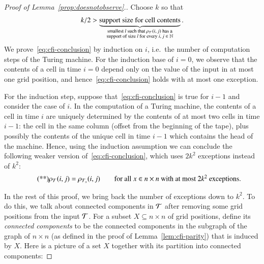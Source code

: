 \begin{proof}[Proof of Lemma~\ref{prop:doesnotobserve}.]
 Choose $k$ so that 
\begin{align*}
k/2 >  \underbrace{\text{support size for cell contents}}_{\substack{\text{smallest $l$ such that $\rho_{{\mathcal T}}(i,j)$ has a}\\ \text{support of size $l$ for every $i,j \in {\mathbb N}$}}}.
\end{align*}
We prove~\eqref{eq:cfi-conclusion} by induction on $i$, i.e.~the number of computation steps of the Turing machine.
For the induction base of $i=0$, we observe that the contents of a cell in time $i=0$ depend only on the value of the input in at most one grid position, and hence~\eqref{eq:cfi-conclusion} holds with at most one exception.

For the induction step, suppose that~\eqref{eq:cfi-conclusion} is true for $i-1$ and consider the case of $i$. In the computation of a Turing machine, the contents of a cell in time $i$ are uniquely determined by the contents of at most two cells in time $i-1$: the cell in the same column (offset from the beginning of the tape), plus possibly the contents of the unique cell in time $i-1$ which contains the head of the machine. Hence, using the induction assumption we can conclude the following weaker version of~\eqref{eq:cfi-conclusion}, which uses $2k^2$ exceptions instead of $k^2$: \begin{align}\tag{**}\label{eq:cfi-conclusion-double}
 \rho_{\mathcal T}(i,j) = \rho_{{\mathcal T}_x}(i,j) \qquad \mbox{for all $x \in n \times n$ with at most $2k^2$ exceptions.}
\end{align}

In the rest of this proof, we bring back the number of exceptions down to $k^2$. To do this, we talk about connected components in ${\mathcal T}$ after removing some grid positions from the input ${\mathcal T}$. For a subset $X \subseteq n \times n$ of grid positions, define its \emph{connected components} to be the connected components in the subgraph of the graph of $n \times n$ (as defined in the proof of Lemma~\ref{lem:cfi-parity}) that is induced by $X$. Here is a picture of a set $X$ together with its partition into connected components:  
%
%
%


\end{proof}
